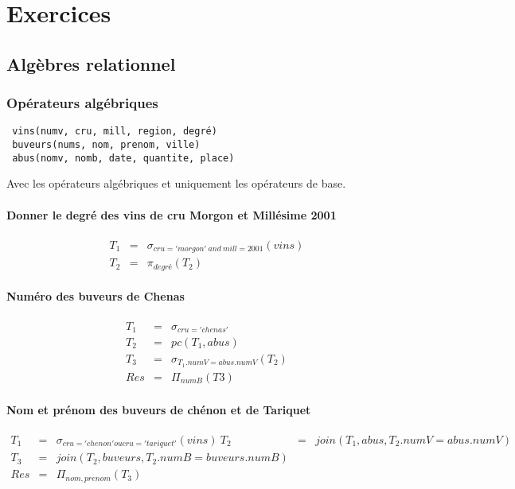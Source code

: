 \chapter{Exercices}
\section{Algèbres relationnel}
\subsection{Opérateurs algébriques}
\texttt{ vins(numv, cru, mill, region, degré) } \\
\texttt{ buveurs(nums, nom, prenom, ville) } \\	
\texttt{ abus(nomv, nomb, date, quantite, place) } \\

	
\begin{attention}
Avec les opérateurs algébriques et uniquement les opérateurs de base. 
\end{attention}

\subsubsection{ Donner le degré des vins de cru Morgon et Millésime 2001 }
\begin{eqnarray*}
	T_1 &=& \sigma_{cru='morgon'~and~mill=2001}(vins)\\
	T_2 &=& \pi_{degré}(T_2)
\end{eqnarray*}
\subsubsection{Numéro des buveurs de Chenas}
\begin{eqnarray*}
	T_1 &=& \sigma_{cru='chenas'}\\
	T_2 &=&  pc(T_1, abus)\\
	T_3 &=& \sigma_{T_1.numV = abus.numV}(T_2)\\
	Res &=& \Pi_{numB}(T3)
\end{eqnarray*}

\subsubsection{Nom et prénom des buveurs de chénon et de Tariquet}

\begin{eqnarray*}
	T_1 &=&  \sigma_{cru='chenon' ou cru='tariquet'}(vins)\
	T_2&=&   join(T_1, abus, T_2.numV= abus.numV)\\
	T_3 &=& join(T_2, buveurs, T_2.numB=buveurs.numB)\\
	Res &=& \Pi_{nom, prenom}(T_3)
\end{eqnarray*}
